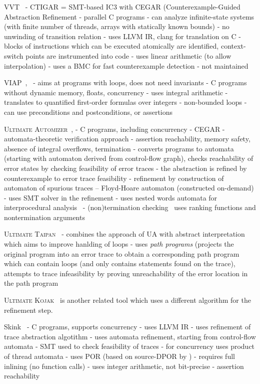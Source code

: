 VVT~\cite{Gunther2016}
- CTIGAR = SMT-based IC3 with CEGAR (Counterexample-Guided Abstraction Refinement 
- parallel C programs
- can analyze infinite-state systems (with finite number of threads, arrays with statically known bounds)
- no unwinding of transition relation
- uses LLVM IR, clang for translation on C
- blocks of instructions which can be executed atomically are identified, context-switch points are instrumented into code
- uses linear arithmetic (to allow interpolation)
- uses a BMC for fast counterexample detection
- not maintained

VIAP~\cite{Rajkhowa2019},~\cite{Rajkhowa2017}
- aims at programs with loops, does not need invariants
- C programs without dynamic memory, floats, concurrency
- uses integral arithmetic
- translates to quantified first-order formulas over integers
- non-bounded loops
- can use preconditions and postconditions, or assertions

\textsc{Ultimate Automizer}~\cite{Heizmann2017}, \cite{Heizmann2013}
- C programs, including concurrency
- CEGAR
- automata-theoretic verification approach
- assertion reachability, memory safety, absence of integral overflows, termination
- converts programs to automata (starting with automaton derived from control-flow graph), checks reachability of error states by checking feasibility of error traces
  - the abstraction is refined by counterexample to error trace feasibility
  - refinement by construction of automaton of spurious traces -- Floyd-Hoare automaton (constructed on-demand)
  - uses SMT solver in the refinement
- uses nested words automata for interprocedural analysis~\cite{TODO}
- (non)termination checking~\cite{TODO: Buchy automizer} uses ranking functions and nontermination arguments

\textsc{Ultimate Taipan}~\cite{Greitschus2017}
- combines the approach of UA with abstract interpretation which aims to improve hanlding of loops
- uses \emph{path programs} (projects the original program into an error trace to obtain a corresponding path program which can contain loops (and only contains statements found on the trace), attempts to trace infeasibility by proving unreachability of the error location in the path program

\textsc{Ultimate Kojak}~\cite{Nutz2015} is another related tool which uses a different algorithm for the refinement step.

Skink~\cite{Cassez2017}
- C programs, supports concurrency
- uses LLVM IR
- uses refinement of trace abstraction algotithm 
  - uses automata refinement, starting from control-flow automata
  - SMT used to check feasibility of traces
  - for concurrency uses product of thread automata
    - uses POR (based on source-DPOR by \cite{Abdulla2014})
- requires full inlining (no function calls)
- uses integer arithmetic, not bit-precise
- assertion reachability

